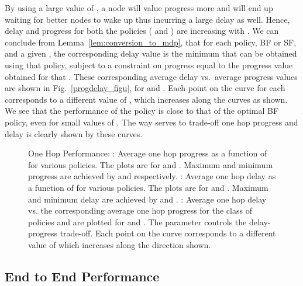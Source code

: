 \documentclass[onecolumn]{IEEEtran}
\begin{document}
By using a large value of , a node will value progress more and
will end up waiting for better nodes to wake up thus incurring a large
delay as well. Hence, delay and progress for both the policies
( and ) are increasing with . We can
conclude from Lemma~\ref{lem:conversion_to_mdp}, that for each policy,
BF or SF, and a given , the corresponding delay value is the
minimum that can be obtained using that policy, subject to a
constraint on progress equal to the progress value obtained for that
.  These corresponding average delay vs.\ average progress values are shown in
Fig.~\ref{progdelay_figu}, for  and .  Each point on the
curve for each  corresponds to a different value of , which
increases along the curves as shown.  We see that the performance of
the  policy is close to that of the optimal BF policy, even for
small values of . The way  serves to trade-off one hop
progress and delay is clearly shown by these curves.

\begin{figure*}[t]
  \centering
{}
\caption{One Hop Performance: : Average one hop progress 
  as a function of  for  various policies. The plots are for
   and . Maximum and minimum progress are achieved by
   and  respectively. : Average one hop delay
  as a function of  for  various
  policies. The plots are for  and . Maximum and minimum
  delay are achieved by  and . : Average one
  hop delay vs. the corresponding average one hop progress for the class of policies  and  are
  plotted for  and . The  parameter  controls the delay-progress trade-off. Each point
  on the curve corresponds to a different value of  which
  increases along the direction shown.}
\end{figure*}

\subsection{End to End Performance} \label{end_subsec} 
\end{document}
